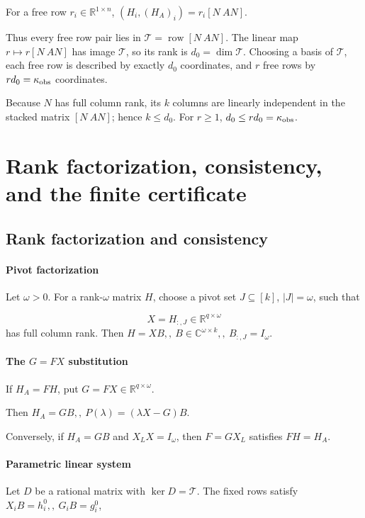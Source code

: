 \documentclass[journal]{IEEEtran}
\theoremstyle{plainn}
\begin{document}
For a free row $r_i\in\mathbb R^{1\times n}$, $(H_i,(H_A)_i)=r_i[N\ AN]$.

Thus every free row pair lies in $\mathcal T=\operatorname{row}[N\ AN]$. The linear map $r\mapsto r[N\ AN]$ has image $\mathcal T$, so its rank is $d_0=\dim\mathcal T$. Choosing a basis of $\mathcal T$, each free row is described by exactly $d_0$ coordinates, and $r$ free rows by $rd_0=\kappa_{\rm obs}$ coordinates.

Because $N$ has full column rank, its $k$ columns are linearly independent in the stacked matrix $[N\ AN]$; hence $k\le d_0$. For $r\ge1$, $d_0\le rd_0=\kappa_{\rm obs}$.




\section{Rank factorization, consistency, and the finite certificate}\label{sec:certificate}
\subsection{Rank factorization and consistency}\label{sec:consistency}
\paragraph*{Pivot factorization}\label{sec:pivot}
Let $\omega>0$. For a rank-$\omega$ matrix $H$, choose a pivot set $J\subseteq[k]$, $|J|=\omega$, such that

\begin{equation}
X=H_{:,J}\in\mathbb R^{q\times\omega}
\end{equation}
has full column rank. Then $H=XB,,\  B\in\mathbb C^{\omega\times k},,\  B_{:,J}=I_\omega$.

\paragraph*{The $G=FX$ substitution}\label{sec:gsub}
If $H_A=FH$, put $G=FX\in\mathbb R^{q\times\omega}$.

Then $H_A=GB,,\  P(\lambda)=(\lambda X-G)B$.

Conversely, if $H_A=GB$ and $X_LX=I_\omega$, then $F=GX_L$ satisfies $FH=H_A$.

\paragraph*{Parametric linear system}\label{sec:param}
Let $D$ be a rational matrix with $\ker D=\mathcal T$. The fixed rows satisfy $X_iB=h_i^0,,\  G_iB=g_i^0$,
\end{document}
